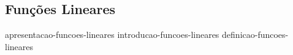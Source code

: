 \subsection{Funções Lineares}

{apresentacao-funcoes-lineares}
{introducao-funcoes-lineares}
{definicao-funcoes-lineares}